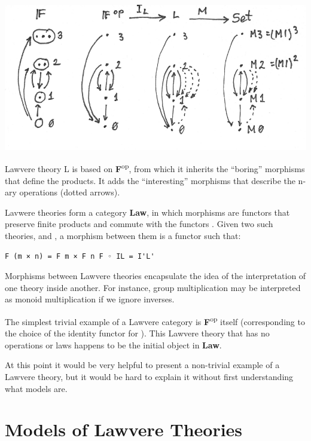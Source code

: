 \hypertarget{attachment_9070}{}
\includegraphics[width=5.31250in]{images/lawvere1.png}

Lawvere theory L is based on \textbf{F}\textsuperscript{op}, from which
it inherits the ``boring'' morphisms that define the products. It adds
the ``interesting'' morphisms that describe the n-ary operations (dotted
arrows).

Lavwere theories form a category \textbf{Law}, in which morphisms are
functors that preserve finite products and commute with the functors
. Given two such theories,  and
, a morphism between them is a
functor  such that:

\begin{Verbatim}[commandchars=\\\{\}]
F (m × n) = F m × F n F ◦ IL = I'L'
\end{Verbatim}

Morphisms between Lawvere theories encapsulate the idea of the
interpretation of one theory inside another. For instance, group
multiplication may be interpreted as monoid multiplication if we ignore
inverses.

The simplest trivial example of a Lawvere category is
\textbf{F}\textsuperscript{op} itself (corresponding to the choice of
the identity functor for ). This Lawvere theory that has no
operations or laws happens to be the initial object in \textbf{Law}.

At this point it would be very helpful to present a non-trivial example
of a Lawvere theory, but it would be hard to explain it without first
understanding what models are.

\section{Models of Lawvere
Theories}\label{models-of-lawvere-theories}


